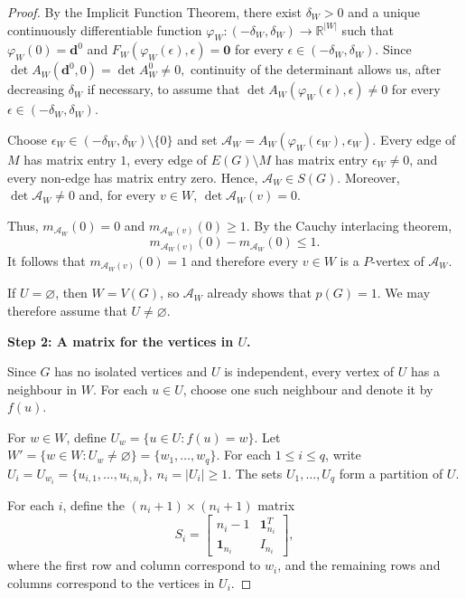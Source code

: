 \documentclass[12pt,reqno]{amsart}
\theoremstyle{plain}
\theoremstyle{definition}
\theoremstyle{block}
\theoremstyle{remark}
\numberwithin{equation}{section}
\begin{document}
\begin{proof}
By the Implicit Function Theorem, there exist \(\delta_W>0\) and a unique
continuously differentiable function
\(
\varphi_W:(-\delta_W,\delta_W)\longrightarrow\mathbb R^{|W|}
\)
such that
\(
\varphi_W(0)=\mathbf d^0
\)
and
\(
F_W(\varphi_W(\epsilon),\epsilon)=\mathbf 0
\)
for every \(\epsilon\in(-\delta_W,\delta_W)\).
Since
\(
\det A_W(\mathbf d^0,0)=\det A_W^0\neq0,
\)
continuity of the determinant allows us, after decreasing \(\delta_W\)
if necessary, to assume that
\(
\det A_W(\varphi_W(\epsilon),\epsilon)\neq0
\)
for every \(\epsilon\in(-\delta_W,\delta_W)\).

Choose
\(
\epsilon_W\in(-\delta_W,\delta_W)\setminus\{0\}
\)
and set
\(
\mathcal A_W
=
A_W(\varphi_W(\epsilon_W),\epsilon_W).
\)
Every edge of \(M\) has matrix entry \(1\), every edge of
\(E(G)\setminus M\) has matrix entry \(\epsilon_W\neq0\), and every
non-edge has matrix entry zero. Hence,
\(
\mathcal A_W\in S(G).
\)
Moreover,
\(
\det\mathcal A_W\neq0
\)
and, for every \(v\in W\),
\(
\det\mathcal A_W(v)=0.
\)

Thus,
\(
m_{\mathcal A_W}(0)=0
\)
and
\(
m_{\mathcal A_W(v)}(0)\geq1.
\)
By the Cauchy interlacing theorem,
\[
m_{\mathcal A_W(v)}(0)-m_{\mathcal A_W}(0)\leq1.
\]
It follows that
\(
m_{\mathcal A_W(v)}(0)=1
\)
and therefore every \(v\in W\) is a \(P\)-vertex of
\(\mathcal A_W\).

If \(U=\varnothing\), then \(W=V(G)\), so \(\mathcal A_W\) already
shows that \(p(G)=1\). We may therefore assume that
\(U\neq\varnothing\).

\medskip

\noindent
\textbf{Step 2: A matrix for the vertices in \(U\).}

Since \(G\) has no isolated vertices and \(U\) is independent, every
vertex of \(U\) has a neighbour in \(W\). For each \(u\in U\), choose
one such neighbour and denote it by \(f(u)\).

For \(w\in W\), define
\(
U_w=\{u\in U:f(u)=w\}.
\)
Let
\(
W'=\{w\in W:U_w\neq\varnothing\}
=
\{w_1,\ldots,w_q\}.
\)
For each \(1\leq i\leq q\), write
\(
U_i=U_{w_i}
=
\{u_{i,1},\ldots,u_{i,n_i}\},
\
n_i=|U_i|\geq1.
\)
The sets \(U_1,\ldots,U_q\) form a partition of \(U\).

For each \(i\), define the \((n_i+1)\times(n_i+1)\) matrix
\[
S_i=
\begin{bmatrix}
n_i-1&\mathbf 1_{n_i}^{T}\\
\mathbf 1_{n_i}&I_{n_i}
\end{bmatrix},
\]
where the first row and column correspond to \(w_i\), and the
remaining rows and columns correspond to the vertices in \(U_i\).


\end{proof}
\end{document}
